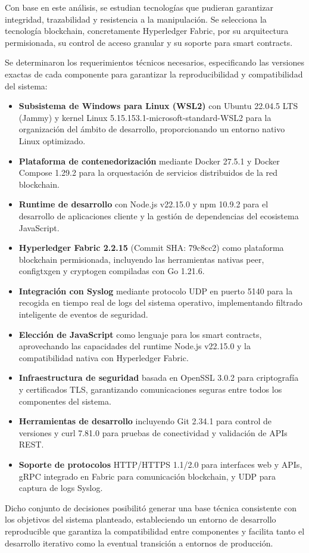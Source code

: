 Con base en este análisis, se estudian tecnologías que pudieran garantizar integridad, trazabilidad y resistencia a la manipulación. Se selecciona la tecnología blockchain, concretamente Hyperledger Fabric, por su arquitectura permisionada, su control de acceso granular y su soporte para smart contracts.

Se determinaron los requerimientos técnicos necesarios, especificando las versiones exactas de cada componente para garantizar la reproducibilidad y compatibilidad del sistema:
\begin{itemize}
\item \textbf{Subsistema de Windows para Linux (WSL2)} con Ubuntu 22.04.5 LTS (Jammy) y kernel Linux 5.15.153.1-microsoft-standard-WSL2 para la organización del ámbito de desarrollo, proporcionando un entorno nativo Linux optimizado.
\item \textbf{Plataforma de contenedorización} mediante Docker 27.5.1 y Docker Compose 1.29.2 para la orquestación de servicios distribuidos de la red blockchain.
\item \textbf{Runtime de desarrollo} con Node.js v22.15.0 y npm 10.9.2 para el desarrollo de aplicaciones cliente y la gestión de dependencias del ecosistema JavaScript.
\item \textbf{Hyperledger Fabric 2.2.15} (Commit SHA: 79c8cc2) como plataforma blockchain permisionada, incluyendo las herramientas nativas peer, configtxgen y cryptogen compiladas con Go 1.21.6.
\item \textbf{Integración con Syslog} mediante protocolo UDP en puerto 5140 para la recogida en tiempo real de logs del sistema operativo, implementando filtrado inteligente de eventos de seguridad.
\item \textbf{Elección de JavaScript} como lenguaje para los smart contracts, aprovechando las capacidades del runtime Node.js v22.15.0 y la compatibilidad nativa con Hyperledger Fabric.
\item \textbf{Infraestructura de seguridad} basada en OpenSSL 3.0.2 para criptografía y certificados TLS, garantizando comunicaciones seguras entre todos los componentes del sistema.
\item \textbf{Herramientas de desarrollo} incluyendo Git 2.34.1 para control de versiones y curl 7.81.0 para pruebas de conectividad y validación de APIs REST.
\item \textbf{Soporte de protocolos} HTTP/HTTPS 1.1/2.0 para interfaces web y APIs, gRPC integrado en Fabric para comunicación blockchain, y UDP para captura de logs Syslog.
\end{itemize}
Dicho conjunto de decisiones posibilitó generar una base técnica consistente con los objetivos del sistema planteado, estableciendo un entorno de desarrollo reproducible que garantiza la compatibilidad entre componentes y facilita tanto el desarrollo iterativo como la eventual transición a entornos de producción.




